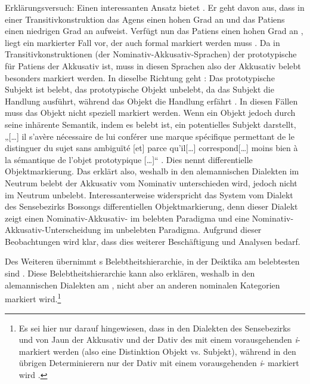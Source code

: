 {Erklärungsversuch}: Einen interessanten Ansatz bietet \citet{Comrie1996}. Er geht davon aus, dass in einer Transitivkonstruktion das Agens einen hohen Grad an  und das Patiens einen niedrigen Grad an  aufweist. Verfügt nun das Patiens einen hohen Grad an , liegt ein markierter Fall vor, der auch formal markiert werden muss \citep[128]{Comrie1996}. Da in Transitivkonstruktionen (der Nominativ-Akkusativ-Sprachen) der prototypische  für Patiens der Akkusativ ist, muss in diesen Sprachen also der Akkusativ belebt besonders markiert werden. In dieselbe Richtung geht \citet{Bossong1998}: Das prototypische Subjekt ist belebt, das prototypische Objekt unbelebt, da das Subjekt die Handlung ausführt, während das Objekt die Handlung erfährt \citep[201]{Bossong1998}. In diesen Fällen muss das Objekt nicht speziell markiert werden. Wenn ein Objekt jedoch durch seine inhärente Semantik, indem es belebt ist, ein potentielles Subjekt darstellt, „[…] il s’avère nécessaire de lui conférer une marque spécifique permettant de le distinguer du sujet sans ambiguïté [et] parce qu’il[…] correspond[…] moins bien à la sémantique de l’objet prototypique […]“ \citep[202]{Bossong1998}. Dies nennt \citet{Bossong1998} differentielle Objektmarkierung. Das erklärt also, weshalb in den alemannischen Dialekten im Neutrum belebt der Akkusativ vom Nominativ unterschieden wird, jedoch nicht im Neutrum unbelebt. Interessanterweise widerspricht das System vom Dialekt des Sensebezirks Bossongs differentiellen Objektmarkierung, denn dieser Dialekt zeigt einen Nominativ-Akkusativ- im belebten Paradigma und eine Nominativ-Akkusativ-Unterscheidung im unbelebten Paradigma. Aufgrund dieser Beobachtungen wird klar, dass dies weiterer Beschäftigung und Analysen bedarf.

Des Weiteren übernimmt \citet{Bossong1998} \citeauthor{Silverstein1976}s \citeyearpar{Silverstein1976} Belebtheitshierarchie, in der Deiktika am belebtesten sind \citep[203]{Bossong1998}. Diese Belebtheitshierarchie kann also erklären, weshalb in den alemannischen Dialekten  am , nicht aber an anderen nominalen Kategorien markiert wird.\footnote{Es sei hier nur darauf hingewiesen, dass in den Dialekten des Sensebezirks und von Jaun der Akkusativ und der Dativ des  mit einem vorausgehenden \textit{i}{}- markiert werden (also eine Distinktion Objekt vs. Subjekt), während in den übrigen Determinierern nur der Dativ mit einem vorausgehenden \textit{i}{}- markiert wird \citep[85]{Seiler2003}.}\largerpage

